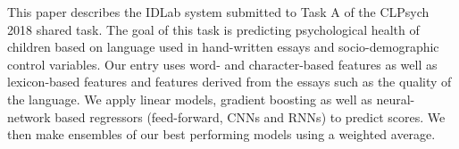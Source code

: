 This paper describes the IDLab system submitted to Task A of the CLPsych 2018 shared task. The goal of this task is predicting psychological health of children based on language used in hand-written essays and socio-demographic control variables. Our entry uses word- and character-based features as well as lexicon-based features and features derived from the essays such as the quality of the language. We apply linear models, gradient boosting as well as neural-network based regressors (feed-forward, CNNs and RNNs) to predict scores. We then make ensembles of our best performing models using a weighted average.
